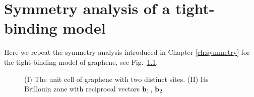 

\chapter{Symmetry analysis of a tight-binding model} \label{app:tb}

Here we repeat the symmetry analysis introduced in Chapter \ref{ch:symmetry} for the tight-binding model of graphene, see Fig.~\ref{fig:app_graphene}. 

\begin{figure} [h!]
	\centering
	
	\caption{(I) The unit cell of graphene with two distinct sites. (II) Its Brillouin zone with reciprocal vectors $\vb{b}_1$, $\vb{b}_2$. }
	\label{fig:app_graphene}
\end{figure}

